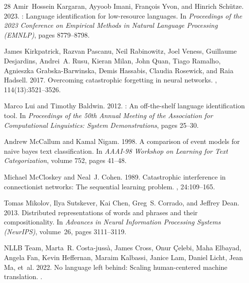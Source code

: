 \documentclass[11pt]{article}
\begin{document}
\begin{thebibliography}{28}
Amir~Hossein Kargaran, Ayyoob Imani, Fran{\c{c}}ois Yvon, and Hinrich Sch{\"u}tze. 2023.
: Language identification for low-resource languages.
\newblock In {\em Proceedings of the 2023 Conference on Empirical Methods in Natural Language Processing (EMNLP)}, pages 8779--8798.

James Kirkpatrick, Razvan Pascanu, Neil Rabinowitz, Joel Veness, Guillaume Desjardins, Andrei~A. Rusu, Kieran Milan, John Quan, Tiago Ramalho, Agnieszka Grabska-Barwinska, Demis Hassabis, Claudia Rosewick, and Raia Hadsell. 2017.
\newblock Overcoming catastrophic forgetting in neural networks.
, 114(13):3521--3526.

Marco Lui and Timothy Baldwin. 2012.
: An off-the-shelf language identification tool.
\newblock In {\em Proceedings of the 50th Annual Meeting of the Association for Computational Linguistics: System Demonstrations}, pages 25--30.

Andrew McCallum and Kamal Nigam. 1998.
\newblock A comparison of event models for naive bayes text classification.
\newblock In {\em AAAI-98 Workshop on Learning for Text Categorization}, volume 752, pages 41--48.

Michael McCloskey and Neal~J. Cohen. 1989.
\newblock Catastrophic interference in connectionist networks: The sequential learning problem.
, 24:109--165.

Tomas Mikolov, Ilya Sutskever, Kai Chen, Greg~S. Corrado, and Jeffrey Dean. 2013.
\newblock Distributed representations of words and phrases and their compositionality.
\newblock In {\em Advances in Neural Information Processing Systems (NeurIPS)}, volume~26, pages 3111--3119.

{NLLB Team}, Marta~R. Costa-juss{\`a}, James Cross, Onur {\c{C}}elebi, Maha Elbayad, Angela Fan, Kevin Heffernan, Maraim Kalbassi, Janice Lam, Daniel Licht, Jean Ma, et~al. 2022.
\newblock No language left behind: Scaling human-centered machine translation.
.


\end{thebibliography}
\end{document}
